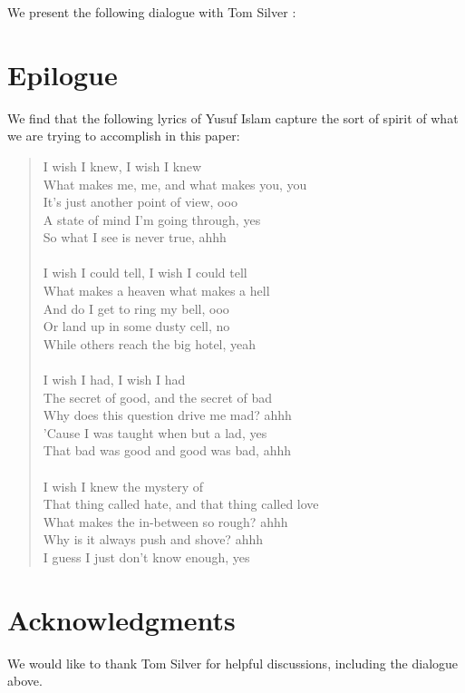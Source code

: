 \documentclass{article}
\begin{document}
We present the following dialogue with Tom Silver \cite{tom}:



\section{Epilogue}

We find that the following lyrics of Yusuf Islam \cite{iwish} capture
the sort of spirit of what we are trying to accomplish in this paper:
\begin{quote}
  I wish I knew, I wish I knew\\
  What makes me, me, and what makes you, you\\
  It's just another point of view, ooo\\
  A state of mind I'm going through, yes\\
  So what I see is never true, ahhh\\
\\
  I wish I could tell, I wish I could tell\\
  What makes a heaven what makes a hell\\
  And do I get to ring my bell, ooo\\
  Or land up in some dusty cell, no\\
  While others reach the big hotel, yeah\\
\\
  I wish I had, I wish I had\\
  The secret of good, and the secret of bad\\
  Why does this question drive me mad? ahhh\\
  'Cause I was taught when but a lad, yes\\
  That bad was good and good was bad, ahhh\\
\\
  I wish I knew the mystery of\\
  That thing called hate, and that thing called love\\
  What makes the in-between so rough? ahhh\\
  Why is it always push and shove? ahhh\\
  I guess I just don't know enough, yes\\
\end{quote}

\section{Acknowledgments}

We would like to thank Tom Silver for helpful discussions, including
the dialogue above.

 

\end{document}
